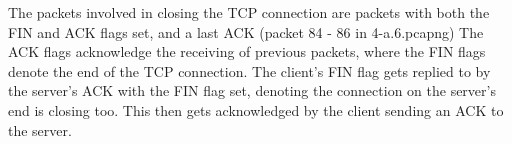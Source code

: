 The packets involved in closing the TCP connection are packets with both the FIN and ACK flags set, and a last ACK (packet 84 - 86 in 4-a.6.pcapng) The ACK flags acknowledge the receiving of previous packets, where the FIN flags denote the end of the TCP connection. The client's FIN flag gets replied to by the server's ACK with the FIN flag set, denoting the connection on the server's end is closing too. This then gets acknowledged by the client sending an ACK to the server.